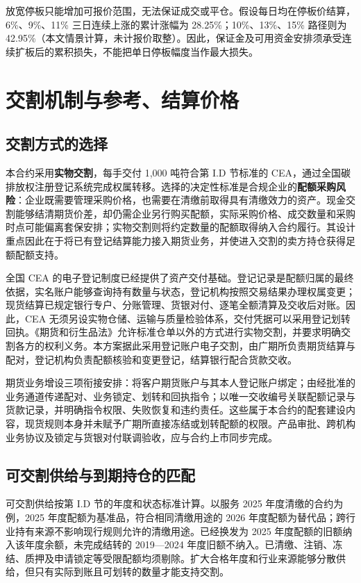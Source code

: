 \documentclass[UTF8,a4paper,11pt,oneside,fontset=fandol]{ctexart}
\begin{document}
放宽停板只能增加可报价范围，无法保证成交或平仓。假设每日均在停板价结算，6\%、9\%、11\% 三日连续上涨的累计涨幅为 28.25\%；10\%、13\%、15\% 路径则为 42.95\%（本文情景计算，未计报价取整）。因此，保证金及可用资金安排须承受连续扩板后的累积损失，不能把单日停板幅度当作最大损失。


\section{交割机制与参考、结算价格}
\subsection{交割方式的选择}
本合约采用\textbf{实物交割}，每手交付 1,000 吨符合第 I.D 节标准的 CEA，通过全国碳排放权注册登记系统完成权属转移。选择的决定性标准是合规企业的\textbf{配额采购风险}：企业既需要管理采购价格，也需要在清缴前取得具有清缴效力的资产。现金交割能够结清期货价差，却仍需企业另行购买配额，实际采购价格、成交数量和采购时点可能偏离套保安排；实物交割则将约定数量的配额取得纳入合约履行。其设计重点因此在于将已有登记结算能力接入期货业务，并使进入交割的卖方持仓获得足额配额支持。

全国 CEA 的电子登记制度已经提供了资产交付基础。登记记录是配额归属的最终依据，实名账户能够查询持有数量与状态，登记机构按照交易结果办理权属变更\cite{mee2021reg}；现货结算已规定银行专户、分账管理、货银对付、逐笔全额清算及交收后对账\cite{mee2021settlement}。因此，CEA 无须另设实物仓储、运输与质量检验体系，交付凭据可以采用登记划转回执。《期货和衍生品法》允许标准仓单以外的方式进行实物交割，并要求明确交割各方的权利义务\cite{futuresLaw2022}。本方案据此采用登记账户电子交割，由广期所负责期货结算与配对，登记机构负责配额核验和变更登记，结算银行配合货款交收。

期货业务增设三项衔接安排：将客户期货账户与其本人登记账户绑定；由经批准的业务通道传递配对、业务锁定、划转和回执指令；以唯一交收编号关联配额记录与货款记录，并明确指令权限、失败恢复和违约责任。这些属于本合约的配套建设内容，现货规则本身并未赋予广期所直接冻结或划转配额的权限。产品审批、跨机构业务协议及锁定与货银对付联调验收，应与合约上市同步完成。

\subsection{可交割供给与到期持仓的匹配}
可交割供给按第 I.D 节的年度和状态标准计算。以服务 2025 年度清缴的合约为例，2025 年度配额为基准品，符合相同清缴用途的 2026 年度配额为替代品；跨行业持有来源不影响现行规则允许的清缴用途\cite{mee2026allocation}。已经换发为 2025 年度配额的旧额纳入该年度余额，未完成结转的 2019—2024 年度旧额不纳入。已清缴、注销、冻结、质押及申请锁定等受限配额均须剔除。扩大合格年度和行业来源能够分散供给，但只有实际到账且可划转的数量才能支持交割。
\end{document}

